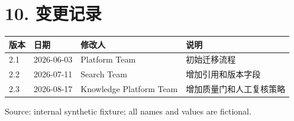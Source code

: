 \documentclass[10.5pt,a4paper]{article}
\begin{document}
\section*{10. 变更记录}
\begin{tabular}{p{24mm}p{24mm}p{38mm}p{65mm}}
\toprule
版本 & 日期 & 修改人 & 说明\\\midrule
2.1 & 2026-06-03 & Platform Team & 初始迁移流程\\
2.2 & 2026-07-11 & Search Team & 增加引用和版本字段\\
2.3 & 2026-08-17 & Knowledge Platform Team & 增加质量门和人工复核策略\\
\bottomrule
\end{tabular}
\vfill\color{muted}\small Source: internal synthetic fixture; all names and values are fictional.
\end{document}
